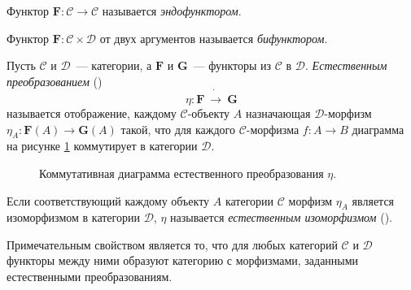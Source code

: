 \begin{definition}
  Функтор $\mathbf{F}: \mathcal{C} \to \mathcal{C}$ называется \emph{эндофунктором}.
\end{definition}

\begin{definition}
  Функтор $\mathbf{F}: \mathcal{C} \times \mathcal{D}$ от двух аргументов называется \emph{бифунктором}.
\end{definition}

\begin{definition}
  Пусть $\mathcal{C}$ и $\mathcal{D}$~--- категории, а $\mathbf{F}$ и $\mathbf{G}$~--- функторы из $\mathcal{C}$ в $\mathcal{D}$. \emph{Естественным преобразованием} () $$\eta : \mathbf{F}~\dot{\to}~\mathbf{G}$$ называется отображение, каждому $\mathcal{C}$-объекту $A$ назначающая $\mathcal{D}$-морфизм $\eta_A : \mathbf{F}(A) \to \mathbf{G}(A)$ такой, что для каждого $\mathcal{C}$-морфизма $f : A \to B$ диаграмма на рисунке \ref{cd:nattrans} коммутирует в категории $\mathcal{D}$.
\end{definition}

\begin{figure}[h]
  \centering
    \caption{Коммутативная диаграмма естественного преобразования $\eta$.}
    \label{cd:nattrans}
\end{figure}

\begin{definition}
  Если соответствующий каждому объекту $A$ категории $\mathcal{C}$ морфизм $\eta_A$ является изоморфизмом в категории $\mathcal{D}$, $\eta$ называется \emph{естественным изоморфизмом} ().
\end{definition}

Примечательным свойством является то, что для любых категорий $\mathcal{C}$ и $\mathcal{D}$ функторы между ними образуют категорию с морфизмами, заданными естественными преобразованиям.

